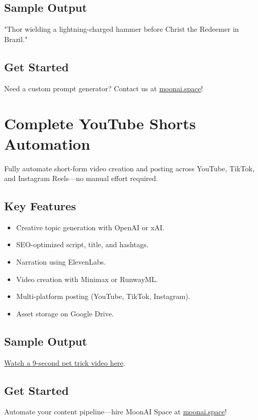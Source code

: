 \documentclass[a4paper,10pt]{article}
\begin{document}
\subsection{Sample Output}
"Thor wielding a lightning-charged hammer before Christ the Redeemer in Brazil."

\subsection{Get Started}
\color{neoncyan} Need a custom prompt generator? Contact us at \href{https://moonai.space}{moonai.space}!
\newpage

\section{Complete YouTube Shorts Automation}
\color{spacewhite}
Fully automate short-form video creation and posting across YouTube, TikTok, and Instagram Reels—no manual effort required.

\subsection{Key Features}
\begin{itemize}[label={\color{neonmagenta}$\bullet$}]
    \item Creative topic generation with OpenAI or xAI.
    \item SEO-optimized script, title, and hashtags.
    \item Narration using ElevenLabs.
    \item Video creation with Minimax or RunwayML.
    \item Multi-platform posting (YouTube, TikTok, Instagram).
    \item Asset storage on Google Drive.
\end{itemize}

\subsection{Sample Output}
\href{https://youtube.com/sample-link}{Watch a 9-second pet trick video here}.

\subsection{Get Started}
\color{neoncyan} Automate your content pipeline—hire MoonAI Space at \href{https://moonai.space}{moonai.space}!
\newpage
\end{document}
